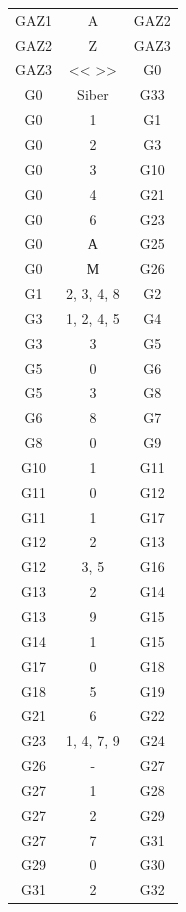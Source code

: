 \documentclass[a4paper,final]{article}
\begin{document}
\begin{longtable}{|c|c|c|}
GAZ1 & A & GAZ2 \\
GAZ2 & Z & GAZ3 \\
GAZ3 & << >> & G0 \\
G0 & Siber & G33 \\
G0 & 1 & G1 \\
G0 & 2 & G3 \\
G0 & 3 & G10 \\
G0 & 4 & G21 \\
G0 & 6 & G23 \\
G0 & А & G25 \\
G0 & М & G26 \\
G1 & 2, 3, 4, 8 & G2 \\
G3 & 1, 2, 4, 5 & G4 \\
G3 & 3 & G5 \\
G5 & 0 & G6 \\
G5 & 3 & G8 \\
G6 & 8 & G7 \\
G8 & 0 & G9 \\
G10 & 1 & G11 \\
G11 & 0 & G12 \\
G11 & 1 & G17 \\
G12 & 2 & G13 \\
G12 & 3, 5 & G16 \\
G13 & 2 & G14 \\
G13 & 9 & G15 \\
G14 & 1 & G15 \\
G17 & 0 & G18 \\
G18 & 5 & G19 \\
G21 & 6 & G22 \\
G23 & 1, 4, 7, 9 & G24 \\
G26 & - & G27 \\
G27 & 1 & G28 \\
G27 & 2 & G29 \\
G27 & 7 & G31 \\
G29 & 0 & G30 \\
G31 & 2 & G32 \\
\hline


\end{longtable}
\end{document}
